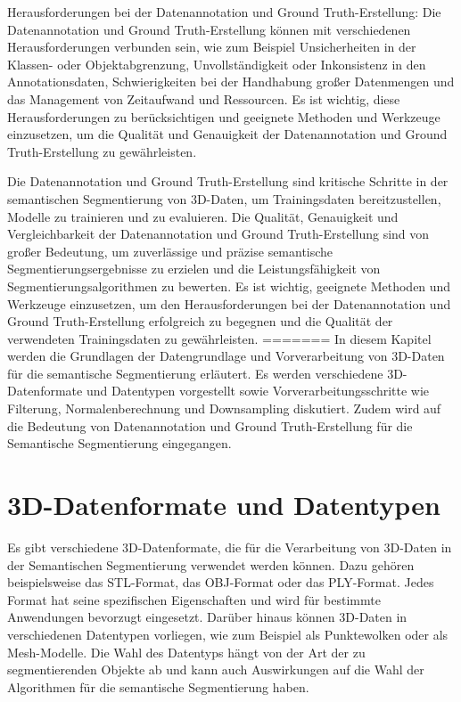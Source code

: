 Herausforderungen bei der Datenannotation und Ground Truth-Erstellung: Die
Datenannotation und Ground Truth-Erstellung können mit verschiedenen
Herausforderungen verbunden sein, wie zum Beispiel Unsicherheiten in der
Klassen- oder Objektabgrenzung, Unvollständigkeit oder Inkonsistenz in den
Annotationsdaten, Schwierigkeiten bei der Handhabung großer Datenmengen und das
Management von Zeitaufwand und Ressourcen. Es ist wichtig, diese
Herausforderungen zu berücksichtigen und geeignete Methoden und Werkzeuge
einzusetzen, um die Qualität und Genauigkeit der Datenannotation und Ground
Truth-Erstellung zu gewährleisten.

Die Datenannotation und Ground Truth-Erstellung sind kritische Schritte in der
semantischen Segmentierung von 3D-Daten, um Trainingsdaten bereitzustellen,
Modelle zu trainieren und zu evaluieren. Die Qualität, Genauigkeit und
Vergleichbarkeit der Datenannotation und Ground Truth-Erstellung sind von
großer Bedeutung, um zuverlässige und präzise semantische
Segmentierungsergebnisse zu erzielen und die Leistungsfähigkeit von
Segmentierungsalgorithmen zu bewerten. Es ist wichtig, geeignete Methoden und
Werkzeuge einzusetzen, um den Herausforderungen bei der Datenannotation und
Ground Truth-Erstellung erfolgreich zu begegnen und die Qualität der
verwendeten Trainingsdaten zu gewährleisten.
=======
In diesem Kapitel werden die Grundlagen der Datengrundlage und Vorverarbeitung
von 3D-Daten für die semantische Segmentierung erläutert. Es werden
verschiedene 3D-Datenformate und Datentypen vorgestellt sowie
Vorverarbeitungsschritte wie Filterung, Normalenberechnung und Downsampling
diskutiert. Zudem wird auf die Bedeutung von Datenannotation und Ground
Truth-Erstellung für die Semantische Segmentierung eingegangen.
\section{3D-Datenformate und Datentypen}
Es gibt verschiedene 3D-Datenformate, die für die Verarbeitung von 3D-Daten in
der Semantischen Segmentierung verwendet werden können. Dazu gehören
beispielsweise das STL-Format, das OBJ-Format oder das PLY-Format. Jedes Format
hat seine spezifischen Eigenschaften und wird für bestimmte Anwendungen
bevorzugt eingesetzt. Darüber hinaus können 3D-Daten in verschiedenen
Datentypen vorliegen, wie zum Beispiel als Punktewolken oder als Mesh-Modelle.
Die Wahl des Datentyps hängt von der Art der zu segmentierenden Objekte ab und
kann auch Auswirkungen auf die Wahl der Algorithmen für die semantische
Segmentierung haben.
